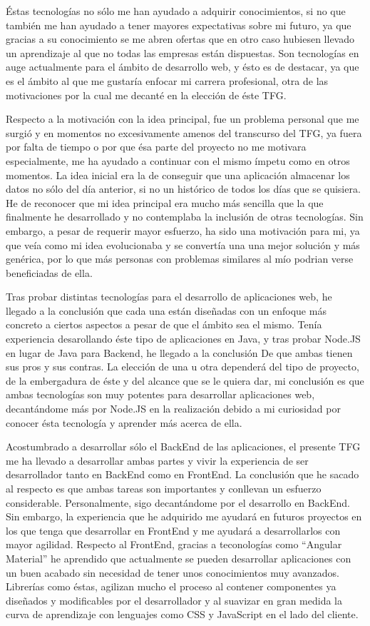 \documentclass[11pt,openany]{book}
\begin{document}
Éstas tecnologías no sólo me han ayudado a adquirir conocimientos, si no que también me han ayudado a tener mayores expectativas sobre mi futuro, ya que gracias a su conocimiento se me abren ofertas que en otro caso hubiesen llevado un aprendizaje al que no todas las empresas están dispuestas. Son tecnologías en auge actualmente para el ámbito de desarrollo web, y ésto es de destacar, ya que es el ámbito al que me gustaría enfocar mi carrera profesional, otra de las motivaciones por la cual me decanté en la elección de éste TFG.

Respecto a la motivación con la idea principal, fue un problema personal que me surgió y en momentos no excesivamente amenos del transcurso del TFG, ya fuera por falta de tiempo o por que ésa parte del proyecto no me motivara especialmente, me ha ayudado a continuar con el mismo ímpetu como en otros momentos. La idea inicial era la de conseguir que una aplicación almacenar los datos no sólo del día anterior, si no un histórico de todos los días que se quisiera. He de reconocer que mi idea principal era mucho más sencilla que la que finalmente he desarrollado y no contemplaba la inclusión de otras tecnologías. Sin embargo, a pesar de requerir mayor esfuerzo, ha sido una motivación para mi, ya que veía como mi idea evolucionaba y se convertía una una mejor solución y más genérica, por lo que más personas con problemas similares al mío podrian verse beneficiadas de ella.

Tras probar distintas tecnologías para el desarrollo de aplicaciones web, he llegado a la conclusión que cada una están diseñadas con un enfoque más concreto a ciertos aspectos a pesar de que el ámbito sea el mismo. Tenía experiencia desarollando éste tipo de aplicaciones en Java, y tras probar Node.JS en lugar de Java para Backend, he llegado a la conclusión De que ambas tienen sus pros y sus contras. La elección de una u otra dependerá del tipo de proyecto, de la embergadura de éste y del alcance que se le quiera dar, mi conclusión es que ambas tecnologías son muy potentes para desarrollar aplicaciones web, decantándome más por Node.JS en la realización debido a mi curiosidad por conocer ésta tecnología y aprender más acerca de ella.

Acostumbrado a desarrollar sólo el BackEnd de las aplicaciones, el presente TFG me ha llevado a desarrollar ambas partes y vivir la experiencia de ser desarrollador tanto en BackEnd como en FrontEnd. La conclusión que he sacado al respecto es que ambas tareas son importantes y conllevan un esfuerzo considerable. Personalmente, sigo decantándome por el desarrollo en BackEnd. Sin embargo, la experiencia que he adquirido me ayudará en futuros proyectos en los que tenga que desarrollar en FrontEnd y me ayudará a desarrollarlos con mayor agilidad. Respecto al FrontEnd, gracias a teconologías como ``Angular Material'' he aprendido que actualmente se pueden desarrollar aplicaciones con un buen acabado sin necesidad de tener unos conocimientos muy avanzados. Librerías como éstas, agilizan mucho el proceso al contener componentes ya diseñados y modificables por el desarrollador y al suavizar en gran medida la curva de aprendizaje con lenguajes como CSS y JavaScript en el lado del cliente.
\end{document}
